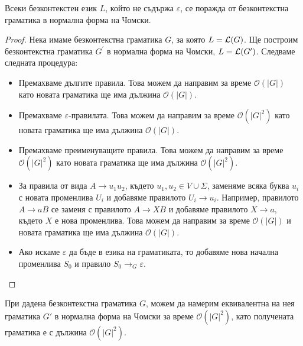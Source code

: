 \begin{framed}
  \begin{theorem}
    Всеки безконтекстен език $L$, който не съдържа $\varepsilon$, се поражда от безконтекстна граматика в нормална форма на Чомски.
  \end{theorem}
\end{framed}
\begin{proof}
  Нека имаме безконтекстна граматика $G$, за която $L = \mathcal{L}(G)$.
  Ще построим безконтекстна граматика $G^\prime$ в нормална форма на Чомски, $L = \mathcal{L}(G^\prime)$.
  Следваме следната процедура:
  \begin{itemize}
  \item
    Премахваме дългите правила.
    Това можем да направим за време $\mathcal{O}(|G|)$
    като новата граматика ще има дължина $\mathcal{O}(|G|)$.
  \item
    Премахваме $\varepsilon$-правилата.
    Това можем да направим за време $\mathcal{O}(|G|^2)$
    като новата граматика ще има дължина $\mathcal{O}(|G|)$.
  \item
    Премахваме преименуващите правила.
    Това можем да направим за време $\mathcal{O}(|G|^2)$
    като новата граматика ще има дължина $\mathcal{O}(|G|^2)$.
  \item
    За правила от вида $A\to u_1 u_2$, където $u_1, u_2 \in V \cup \Sigma$, 
    заменяме всяка буква $u_i$ с новата променлива $U_i$
    и добавяме правилото $U_i\to u_i$.
    Например, правилото $A \to aB$ се заменя с правилото $A \to XB$ и добавяме правилото $X \to a$,
    където $X$ е нова променлива.
    Това можем да направим за време $\mathcal{O}(|G|)$ и новата граматика ще има дължина $\mathcal{O}(|G|)$.
  \item
    Ако искаме $\varepsilon$ да бъде в езика на граматиката, то добавяме нова начална променлива $S_0$
    и правило $S_0 \to_G \varepsilon$.
  \end{itemize}
\end{proof}

\begin{theorem}
  При дадена безконтекстна граматика $G$, можем да намерим еквивалентна
  на нея граматика $G'$ в нормална форма на Чомски за време $\mathcal{O}(|G|^2)$,
  като получената граматика е с дължина $\mathcal{O}(|G|^2)$.
\end{theorem}

